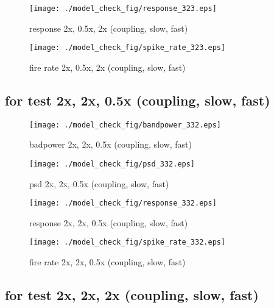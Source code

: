 \documentclass[11pt]{article}
\begin{document}
\begin{figure}[htbp]
\begin{center}
\texttt{[image: ./model\_check\_fig/response\_323.eps]}
\caption{response 2x, 0.5x, 2x (coupling, slow, fast)}
\end{center}
\end{figure}

\begin{figure}[htbp]
\begin{center}
\texttt{[image: ./model\_check\_fig/spike\_rate\_323.eps]}
\caption{fire rate 2x, 0.5x, 2x (coupling, slow, fast)}
\end{center}
\end{figure}


\subsection{for test 2x, 2x, 0.5x (coupling, slow, fast)}
\label{sec:org332}

\begin{figure}[htbp]
\centering
\texttt{[image: ./model\_check\_fig/bandpower\_332.eps]}
\caption{badpower 2x, 2x, 0.5x (coupling, slow, fast)}
\end{figure}

\begin{figure}[htbp]
\begin{center}
\texttt{[image: ./model\_check\_fig/psd\_332.eps]}
\caption{psd 2x, 2x, 0.5x (coupling, slow, fast)}
\end{center}
\end{figure}

\begin{figure}[htbp]
\begin{center}
\texttt{[image: ./model\_check\_fig/response\_332.eps]}
\caption{response 2x, 2x, 0.5x (coupling, slow, fast)}
\end{center}
\end{figure}

\begin{figure}[htbp]
\begin{center}
\texttt{[image: ./model\_check\_fig/spike\_rate\_332.eps]}
\caption{fire rate 2x, 2x, 0.5x (coupling, slow, fast)}
\end{center}
\end{figure}


\subsection{for test 2x, 2x, 2x (coupling, slow, fast)}
\label{sec:org333}
\end{document}
